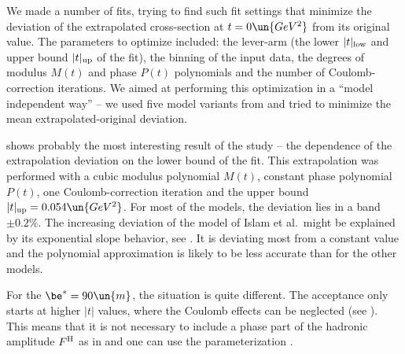 
We made a number of fits, trying to find such fit settings that minimize the deviation of the extrapolated cross-section at $t=0\un{GeV^2}$ from its original value. The parameters to optimize included: the lever-arm (the lower $|t|_{\rm low}$ and upper bound $|t|_{\rm up}$ of the fit), the binning of the input data, the degrees of modulus $M(t)$ and phase $P(t)$ polynomials and the number of Coulomb-correction iterations. We aimed at performing this optimization in a ``model independent way'' -- we used five model variants from  and tried to minimize the mean extrapolated-original deviation.


 shows probably the most interesting result of the study -- the dependence of the extrapolation deviation on the lower bound of the fit. This extrapolation was performed with a cubic modulus polynomial $M(t)$, constant phase polynomial $P(t)$, one Coulomb-correction iteration and the upper bound $|t|_{\rm up} = 0.054\un{GeV^2}$. For most of the models, the deviation lies in a band $\pm 0.2\percent$. The increasing deviation of the model of Islam et al.~might be explained by its exponential slope behavior, see . It is deviating most from a constant value and the polynomial approximation is likely to be less accurate than for the other models.





\def\OutlineLabel{Extrapolation for beta* = 90 m optics}

For the $\be^* = 90\un{m}$, the situation is quite different. The acceptance only starts at higher $|t|$ values, where the Coulomb effects can be neglected (see ). This means that it is not necessary to include a phase part of the hadronic amplitude $F^{\rm H}$ as in  and one can use the parameterization . 


